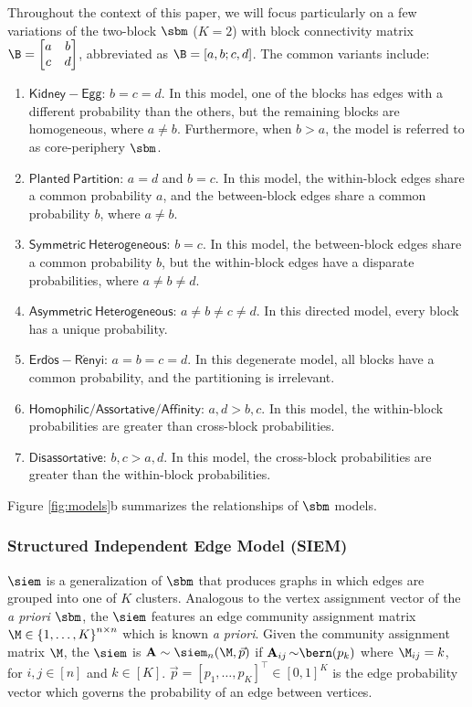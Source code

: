 Throughout the context of this paper, we will focus particularly on a few variations of the two-block $\sbm$ ($K=2$) with block connectivity matrix $\B = \begin{bmatrix}a & b \\ c & d \end{bmatrix}$, abbreviated as $\B = [a, b; c, d]$. The common variants include:
\begin{enumerate}
    \item $\mathsf{Kidney-Egg}$: $b = c = d$. In this model, one of the blocks has edges with a different probability than the others, but the remaining blocks are homogeneous, where $a \neq b$. Furthermore, when $b > a$, the model is referred to as core-periphery $\sbm$.
    \item $\mathsf{Planted~Partition}$: $a = d$ and $b = c$. In this model, the within-block edges share a common probability $a$, and the between-block edges share a common probability $b$, where $a \neq b$.
    \item $\mathsf{Symmetric~ Heterogeneous}$: $b = c$. In this model, the between-block edges share a common probability $b$, but the within-block edges have a disparate probabilities, where $a \neq b \neq d$. 
    \item $\mathsf{Asymmetric~ Heterogeneous}$: $a \neq b \neq c \neq d$. In this directed model, every block has a unique probability.
    \item $\mathsf{Erd\ddot{o}s-R\acute{e}nyi}$: $a=b=c=d$. In this degenerate model, all blocks have a common probability, and the partitioning is irrelevant. 
    \item $\mathsf{Homophilic/Assortative/Affinity}$: $a, d > b, c$. In this model, the within-block probabilities are greater than cross-block probabilities.
    \item $\mathsf{Disassortative}$: $ b, c > a, d$. In this model, the cross-block probabilities are greater than the within-block probabilities.
\end{enumerate}
Figure \ref{fig:models}b summarizes the relationships of $\sbm$ models.

\subsubsection{Structured Independent Edge Model (SIEM)}\label{sec:usiem}
$\siem$ is a generalization of $\sbm$ that produces graphs in which edges are grouped into one of $K$ clusters. Analogous to the vertex assignment vector of the \textit{a priori} $\sbm$, the $\siem$ features an edge community assignment matrix $\M \in \left\{1, \hdots, K\right\}^{n \times n}$ which is known \textit{a priori}. Given the community assignment matrix $\M$, the $\siem$ is $\A \sim \siem_n(\M, \vec p)$ if $\A_{ij} {\sim}\bern(p_k)$ where $\M_{ij} = k$, for $i, j \in [n]$ and $k \in [K]$. $\vec p = [p_1, \hdots, p_K]^\top \in [0, 1]^K$ is the edge probability vector which governs the probability of an edge between vertices. 

